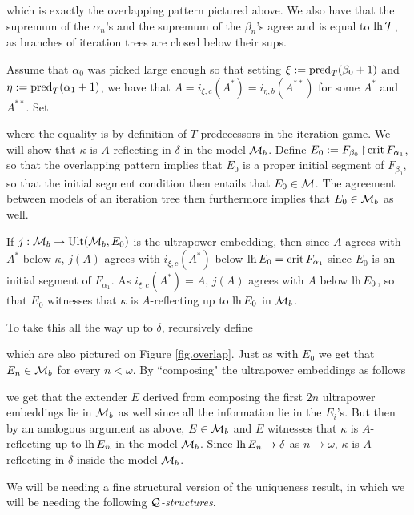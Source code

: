 {which is exactly the overlapping pattern pictured above. We also have that the supremum of the $\alpha_n$'s and the supremum of the $\beta_n$'s agree and is equal to $\operatorname{lh}\operatorname{\mathcal{T}}$, as branches of iteration trees are closed below their sups.

\qquad Assume that $\alpha_0$ was picked large enough so that setting $\xi:=\operatorname{pred}_T(\beta_0+1)$ and $\eta:=\operatorname{pred}_T(\alpha_1+1)$, we have that $A=i_{\xi,c}(A^*)=i_{\eta,b}(A^{**})$ for some $A^*$ and $A^{**}$. Set

where the equality is by definition of $T$-predecessors in the iteration game. We will show that $\kappa$ is $A$-reflecting in $\delta$ in the model $\operatorname{\mathcal{M}}_b$. Define $E_0:=F_{\beta_0}\operatorname{\upharpoonright}\operatorname{crit} F_{\alpha_1}$, so that the overlapping pattern implies that $E_0$ is a proper initial segment of $F_{\beta_0}$, so that the initial segment condition then entails that $E_0\in\operatorname{\mathcal{M}}$. The agreement between models of an iteration tree then furthermore implies that $E_0\in\operatorname{\mathcal{M}}_b$ as well.

\qquad If $j:\operatorname{\mathcal{M}}_b\to\operatorname{Ult}(\operatorname{\mathcal{M}}_b,E_0)$ is the ultrapower embedding, then since $A$ agrees with $A^*$ below $\kappa$, $j(A)$ agrees with $i_{\xi,c}(A^*)$ below $\operatorname{lh} E_0=\operatorname{crit} F_{\alpha_1}$ since $E_0$ is an initial segment of $F_{\alpha_1}$. As $i_{\xi,c}(A^*)=A$, $j(A)$ agrees with $A$ below $\operatorname{lh} E_0$, so that $E_0$ witnesses that $\kappa$ is $A$-reflecting up to $\operatorname{lh} E_0$ in $\operatorname{\mathcal{M}}_b$.

\qquad To take this all the way up to $\delta$, recursively define

which are also pictured on Figure \ref{fig.overlap}. Just as with $E_0$ we get that $E_n\in\operatorname{\mathcal{M}}_b$ for every $n<\omega$. By ``composing" the ultrapower embeddings as follows

we get that the extender $E$ derived from composing the first $2n$ ultrapower embeddings lie in $\operatorname{\mathcal{M}}_b$ as well since all the information lie in the $E_i$'s. But then by an analogous argument as above, $E\in\operatorname{\mathcal{M}}_b$ and $E$ witnesses that $\kappa$ is $A$-reflecting up to $\operatorname{lh} E_n$ in the model $\operatorname{\mathcal{M}}_b$. Since $\operatorname{lh} E_n\to\delta$ as $n\to\omega$, $\kappa$ is $A$-reflecting in $\delta$ inside the model $\operatorname{\mathcal{M}}_b$.
}

We will be needing a fine structural version of the uniqueness result, in which we will be needing the following \textit{$\operatorname{\mathcal{Q}}$-structures}.

